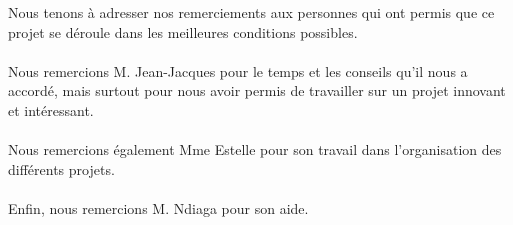 Nous tenons à adresser nos remerciements aux personnes qui ont permis que ce projet se déroule dans les meilleures conditions possibles.\\
\\
Nous remercions M. Jean-Jacques  pour le temps et les conseils qu'il nous a accordé, mais surtout pour nous avoir permis de travailler sur un projet innovant et intéressant.\\
\\
Nous remercions également Mme Estelle  pour son travail dans l'organisation des différents projets. \\
\\
Enfin, nous remercions M. Ndiaga  pour son aide.
